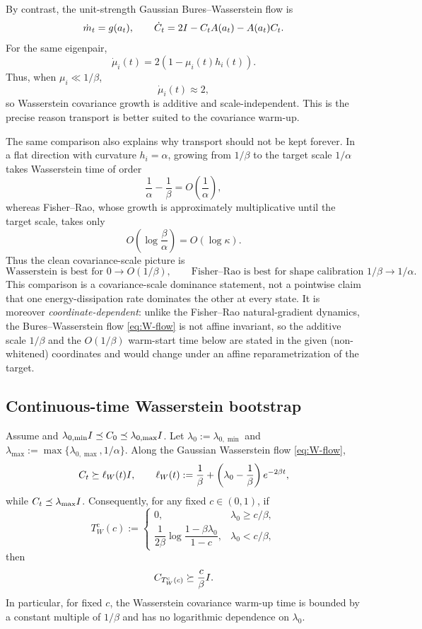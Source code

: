 By contrast, the unit-strength Gaussian Bures--Wasserstein flow is
\begin{equation}
\label{eq:W-flow}
    \dot m_t=g(a_t),
    \qquad
    \dot C_t=2I-C_tA(a_t)-A(a_t)C_t.
\end{equation}
For the same eigenpair,
\[
    \dot\mu_i(t)=2(1-\mu_i(t)h_i(t)).
\]
Thus, when $\mu_i\ll1/\beta$,
\[
    \dot\mu_i(t)\approx2,
\]
so Wasserstein covariance growth is additive and scale-independent. This is the precise
reason transport is better suited to the covariance warm-up.

The same comparison also explains why transport should not be kept forever. In a flat direction
with curvature $h_i=\alpha$, growing from $1/\beta$ to the target scale $1/\alpha$ takes
Wasserstein time of order
\[
    \frac1\alpha-\frac1\beta=O\!\left(\frac1\alpha\right),
\]
whereas Fisher--Rao, whose growth is approximately multiplicative until the target scale, takes
only
\[
    O\!\left(\log\frac\beta\alpha\right)=O(\log\kappa).
\]
Thus the clean covariance-scale picture is
\[
    \boxed{
    \text{Wasserstein is best for }0\to O(1/\beta),
    \qquad
    \text{Fisher--Rao is best for shape calibration }1/\beta\to1/\alpha.
    }
\]
This comparison is a covariance-scale dominance statement, not a pointwise claim that one
energy-dissipation rate dominates the other at every state. It is moreover
\emph{coordinate-dependent}: unlike the Fisher--Rao natural-gradient dynamics, the
Bures--Wasserstein flow \eqref{eq:W-flow} is not affine invariant, so the additive scale
$1/\beta$ and the $O(1/\beta)$ warm-start time below are stated in the given
(non-whitened) coordinates and would change under an affine reparametrization of the
target.

\subsection{Continuous-time Wasserstein bootstrap}

\begin{lemma}
\label{lem:W-cov-bootstrap}
Assume  and
$\lambda_{0,\min}I\preceq C_0\preceq\lambda_{0,\max}I$. Let
$\lambda_0:=\lambda_{0,\min}$ and
$\lambda_{\max}:=\max\{\lambda_{0,\max},1/\alpha\}$. Along the Gaussian Wasserstein flow
\eqref{eq:W-flow},
\[
    C_t\succeq \ell_W(t)I,
    \qquad
    \ell_W(t):=\frac1\beta+\left(\lambda_0-\frac1\beta\right)e^{-2\beta t},
\]
while $C_t\preceq\lambda_{\max}I$. Consequently, for any fixed $c\in(0,1)$, if
\[
    T_W^{\mathrm c}(c)
    :=
    \begin{cases}
    0,
    & \lambda_0\ge c/\beta,\\[3pt]
    \dfrac1{2\beta}\log\dfrac{1-\beta\lambda_0}{1-c},
    & \lambda_0<c/\beta,
    \end{cases}
\]
then
\[
    C_{T_W^{\mathrm c}(c)}\succeq \frac c\beta I.
\]
In particular, for fixed $c$, the Wasserstein covariance warm-up time is bounded by a constant
multiple of $1/\beta$ and has no logarithmic dependence on $\lambda_0$.
\end{lemma}

